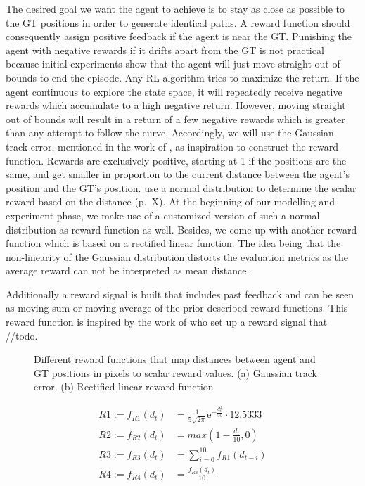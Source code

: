 The desired goal we want the agent to achieve is to stay as close as possible to the GT positions in order to generate identical paths. A reward function should consequently assign positive feedback if the agent is near the GT. Punishing the agent with negative rewards if it drifts apart from the GT is not practical because initial experiments show that the agent will just move straight out of bounds to end the episode. Any RL algorithm tries to maximize the return. If the agent continuous to explore the state space, it will repeatedly receive negative rewards which accumulate to a high negative return. However, moving straight out of bounds will result in a return of a few negative rewards which is greater than any attempt to follow the curve. Accordingly, we will use the Gaussian track-error, mentioned in the work of \cite{martinsen2018curved}, as inspiration to construct the reward function. Rewards are exclusively positive, starting at 1 if the positions are the same, and get smaller in proportion to the current distance between the agent's position and the GT's position. \cite{martinsen2018curved} use a normal distribution to determine the scalar reward based on the distance (p.~X). At the beginning of our modelling and experiment phase, we make use of a customized version of such a normal distribution as reward function as well. Besides, we come up with another reward function which is based on a rectified linear function. The idea being that the non-linearity of the Gaussian distribution distorts the evaluation metrics as the average reward can not be interpreted as mean distance. 
\par
Additionally a reward signal is built that includes past feedback and can be seen as moving sum or moving average of the prior described reward functions. This reward function is inspired by the work of \cite{edgarod} who set up a reward signal that //todo.


\begin{figure}[H]
    \centering
    \begin{subfigure}[b]{0.495\textwidth}
        
        \label{fig:reward1}
    \end{subfigure}
    \begin{subfigure}[b]{0.495\textwidth}
        
        \label{fig:reward2}
    \end{subfigure}
    \caption{Different reward functions that map distances between agent and GT positions in pixels to scalar reward values. (a) Gaussian track error. (b) Rectified linear reward function}
    \label{fig:rewardFunctions}
\end{figure}

\begin{equation}
\begin{aligned}
    R1 := f_{R1}(d_t) &= \frac{1}{5 \sqrt{2\pi}} \mathrm{e}^{-\frac{d_t^2}{50}} \cdot 12.5333
\\
R2 := f_{R2}(d_t) &= max(1 - \frac{d_t}{10}, 0)
\\
    R3 := f_{R3}(d_t) &= \sum_{i=0}^{10}{f_{R1}(d_{t-i})}
\\
    R4 := f_{R4}(d_t) &= \frac{f_{R3}(d_t)}{10}
    \end{aligned}
\end{equation}
